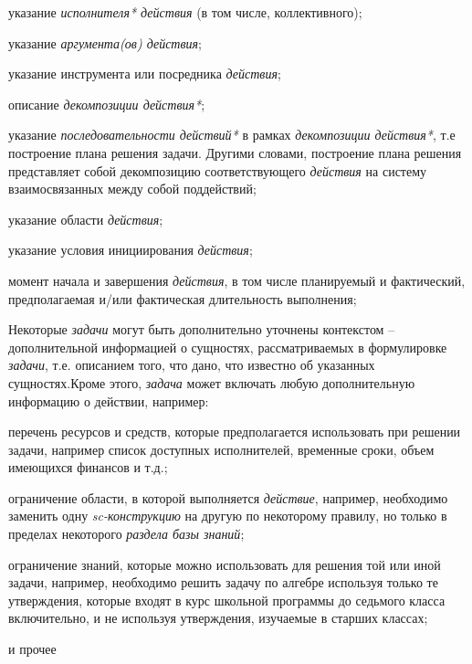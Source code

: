 \begin{SCn}
\begin{scnsubstruct}
{\begin{scnitemize}
                \item указание \textit{исполнителя* действия} (в том числе, коллективного);
                \item указание \textit{аргумента(ов) действия\scnrolesign};
                \item указание инструмента или посредника \textit{действия};
                \item описание \textit{декомпозиции действия*};
                \item указание \textit{последовательности действий*} в рамках \textit{декомпозиции действия*}, т.е построение плана решения задачи. Другими словами, построение плана решения представляет собой декомпозицию соответствующего \textit{действия} на систему взаимосвязанных между собой поддействий;
                \item указание области \textit{действия};
                \item указание условия инициирования \textit{действия};
                \item момент начала и завершения \textit{действия}, в том числе планируемый и фактический, предполагаемая и/или фактическая длительность выполнения;
            \end{scnitemize}
            Некоторые \textit{задачи} могут быть дополнительно уточнены контекстом -- дополнительной информацией о сущностях, рассматриваемых в формулировке \textit{задачи}, т.е. описанием того, что дано, что известно об указанных сущностях.Кроме этого, \textit{задача} может включать любую дополнительную информацию о действии, например:
            \begin{scnitemize}
                \item перечень ресурсов и средств, которые предполагается использовать при решении задачи, например список доступных исполнителей, временные сроки, объем имеющихся финансов и т.д.;
                \item ограничение области, в которой выполняется \textit{действие}, например, необходимо заменить одну \textit{\mbox{sc-конструкцию}} на другую по некоторому правилу, но только в пределах некоторого \textit{раздела базы знаний};
                \item ограничение знаний, которые можно использовать для решения той или иной задачи, например, необходимо решить задачу по алгебре используя только те утверждения, которые входят в курс школьной программы до седьмого класса включительно, и не используя утверждения, изучаемые в старших классах;
                \item и прочее

\end{scnitemize}}
\end{scnsubstruct}
\end{SCn}
